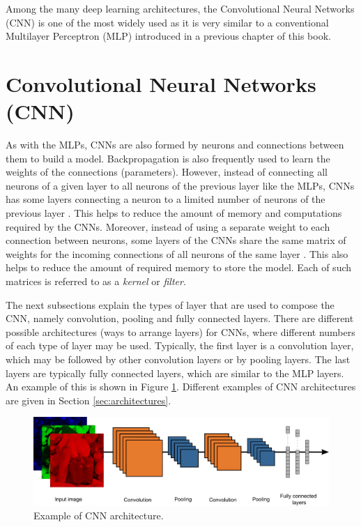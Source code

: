 Among the many deep learning architectures, the Convolutional Neural Networks (CNN) is one of the most widely used as it is very similar to a conventional Multilayer Perceptron (MLP) introduced in a previous chapter of this book.

\section{Convolutional Neural Networks (CNN)}

As with the MLPs, CNNs are also formed by neurons and connections between them to build a model. Backpropagation is also frequently used to learn the weights of the connections (parameters). However, instead of connecting all neurons of a given layer to all neurons of the previous layer like the MLPs, CNNs has some layers connecting a neuron to a limited number of neurons of the previous layer \cite{Patel2018}. This helps to reduce the amount of memory and computations required by the CNNs. Moreover, instead of using a separate weight to each connection between neurons, some layers of the CNNs share the same matrix of weights for the incoming connections of all neurons of the same layer \cite{Patel2018}. This also helps to reduce the amount of required memory to store the model. Each of such matrices is referred to as a \textit{kernel} or \textit{filter}. 

The next subsections explain the types of layer that are used to compose the CNN, namely convolution, pooling and fully connected layers. There are different possible architectures (ways to arrange layers) for CNNs, where different numbers of each type of layer may be used. Typically, the first layer is a convolution layer, which may be followed by other convolution layers or by pooling layers. The last layers are typically fully connected layers, which are similar to the MLP layers. An example of this is shown in Figure \ref{fig:figure123}. Different examples of CNN architectures are given in Section \ref{sec:architectures}.

\begin{figure}
    \centering
    \includegraphics[scale=0.22]{"Part 3 - Learning Systems/Supervised Learning/Deep Learning/images/figure123.png"}
    \caption{Example of CNN architecture.}
    \label{fig:figure123}
\end{figure}

